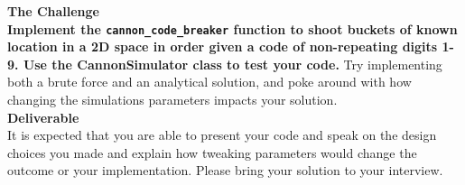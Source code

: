 \documentclass{article}
\begin{document}
\noindent
\textbf{The Challenge} \\
\noindent
\textbf{Implement the \texttt{cannon\_code\_breaker} function to shoot buckets of known location in a 2D space in order given a code of non-repeating digits 1-9. Use the CannonSimulator class to test your code.} Try implementing both a brute force and an analytical solution, and poke around with how changing the simulations parameters impacts your solution. \\

\noindent
\textbf{Deliverable}\\
It is expected that you are able to present your code and speak on the design choices you made and explain how tweaking parameters would change the outcome or your implementation. Please bring your solution to your interview. 
\end{document}
